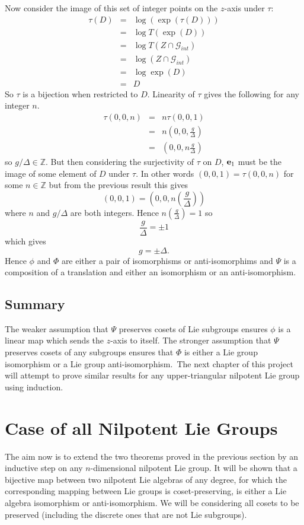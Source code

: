 \documentclass[honours]{UNSWthesis}
\newcommand{\Z}{\mathbb{Z}}
\newcommand{\G}{\mathcal{G}}
\newcommand{\1}{\mathbf{e}_{1}}
\newcommand{\2}{\mathbf{e}_{3}}
\newcommand{\3}{\mathbf{e}_{3}}
\begin{document}
Now consider the image of this set of integer points on the $z$-axis under $\tau$:
\begin{eqnarray*}
\tau(D)&=& \log(\exp (\tau(D))) \\
&=& \log T(\exp (D)) \\
&=& \log T(Z \cap \G_{int}) \\
&=& \log (Z \cap \G_{int}) \\
&=& \log \exp (D) \\
&=& D
\end{eqnarray*}
So $\tau$ is a bijection when restricted to $D$. Linearity of $\tau$ gives the following for any integer $n$.
\begin{eqnarray*}
\tau (0,0,n) &=& n \tau (0,0,1) \\
&=& n\left(0,0, \frac{g}{\Delta}\right) \\
&=& \left(0,0, n \frac{g}{\Delta}\right)
\end{eqnarray*}
so $g/\Delta \in \Z$. But then considering the surjectivity of $\tau$ on $D$, ${\bf e}_{1}$ must be the image of some element of $D$ under $\tau$. In other words $(0,0,1)=\tau(0,0,n)$ for some $n \in \Z$ but from the previous result this gives 
\[
(0,0,1)=\left(0,0, n\left(\frac{g}{\Delta}\right)\right)
\]
where $n$ and $g/\Delta$ are both integers. Hence $n \left( \frac{g}{\Delta}\right)=1$ so 
\[
\frac{g}{\Delta}= \pm 1
\]
which gives
\[
g=\pm \Delta.
\]
Hence $\phi$ and $\Phi$ are either a pair of isomorphisms or anti-isomorphims and $\Psi$ is a composition of a translation and either an isomorphism or an anti-isomorphism.

\section{Summary}
The weaker assumption that $\Psi$ preserves cosets of Lie subgroups ensures $\phi$ is a linear map which sends the $z$-axis to itself. The stronger assumption that $\Psi$ preserves cosets of any subgroups ensures that $\Phi$ is either a Lie group isomorphism or a Lie group anti-isomorphism.\
The next chapter of this project will attempt to prove similar results for any upper-triangular nilpotent Lie group using induction. 






\chapter{Case of all Nilpotent Lie Groups}
The aim now is to extend the two theorems proved in the previous section by an inductive step on any $n$-dimensional nilpotent Lie group. It will be shown that a bijective map between two nilpotent Lie algebras of any degree, for which the corresponding mapping between Lie groups is coset-preserving, is either a Lie algebra isomorphism or anti-isomorphism. We will be considering all cosets to be preserved (including the discrete ones that are not Lie subgroups). 
\end{document}

